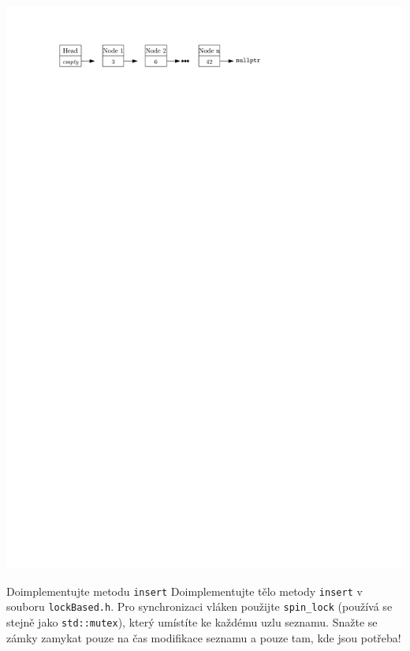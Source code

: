 \documentclass[usenames,dvipsnames,9pt]{beamer}
\begin{document}
{\begin{frame}[fragile]
  \begin{04/figure}
    \centering\includegraphics{04/figs/linkedList.pdf}
  \end{04/figure}
  
    \pause

  \vspace{2em}
  
  \begin{block}{Doimplementujte metodu \texttt{insert}}
    Doimplementujte tělo metody \texttt{insert} v souboru \texttt{lockBased.h}.
    Pro synchronizaci vláken použijte \texttt{spin\_lock} (používá se stejně jako \texttt{std::mutex}), který umístíte ke každému uzlu seznamu.
    Snažte se zámky zamykat pouze na čas modifikace seznamu a pouze tam, kde jsou potřeba!
  \end{block}
\end{frame}
}
\end{document}
